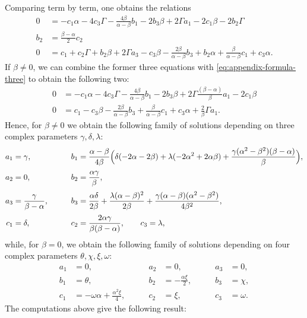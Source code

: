 \documentclass[10pt]{article}
\theoremstyle{definition}
\begin{document}
\endgroup
Comparing term by term, one obtains the relations
\begin{align*}
0 &= - c_1\alpha- 4c_3 \Gamma - \frac{4 \beta}{\alpha - \beta}b_1 - 2 b_3\beta+ 2 \Gamma a_1 - 2c_1 \beta- 2b_2 \Gamma \\
b_2 &=  \frac{\beta - \alpha}{2}c_2 \\
0 &= c_1+ c_2 \Gamma+ b_2 \beta +2 \Gamma a_3 - c_3 \beta- \frac{2 \beta}{\alpha - \beta}b_3 +  b_2 \alpha+ \frac{\beta}{\alpha - \beta}c_1+ c_3 \alpha.
\end{align*}
If $\beta\neq0$, we can combine the former three equations with \eqref{eq:appendix-formula-three} to obtain the following two:
\begin{align*}
0 &= - c_1\alpha- 4c_3 \Gamma - \frac{4\beta}{\alpha - \beta}b_1  - 2 b_3\beta+ 2 \Gamma\frac{(\beta-\alpha)}{\beta} a_1 - 2c_1 \beta \\
0 &= c_1 - c_3 \beta- \frac{2 \beta}{\alpha - \beta}b_3 +   \frac{\beta}{\alpha - \beta}c_1+ c_3 \alpha+\frac{2}{\beta}\Gamma a_{1}.
\end{align*}
Hence, for $\beta \neq 0$ we obtain the following family of solutions depending on three complex parameters $\gamma,\delta,\lambda$:
\[
\begin{aligned}
a_1 &= \gamma, \qquad &
b_1 &= \frac{\alpha-\beta}{4\beta}\Bigl(\delta(-2\alpha-2\beta)
+\lambda(-2\alpha^2+2\alpha\beta)
+\frac{\gamma(\alpha^2-\beta^2)(\beta-\alpha)}{\beta}\Bigr),\\[0.5ex]
a_2 &= 0, \qquad &
b_2 &= \frac{\alpha\gamma}{\beta},\\[0.5ex]
a_3 &= \frac{\gamma}{\beta-\alpha}, \qquad &
b_3 &= \frac{\alpha\delta}{2\beta}
+\frac{\lambda(\alpha-\beta)^2}{2\beta}
+\frac{\gamma(\alpha-\beta)(\alpha^2-\beta^2)}{4\beta^2},\\[0.5ex]
c_1 &= \delta, \qquad &
c_2 &= \frac{2\alpha\gamma}{\beta(\beta-\alpha)}, \qquad
c_3 = \lambda,
\end{aligned}
\]
while, for $\beta=0$, we obtain the following family of solutions depending on four complex parameters $\theta,\chi,\xi,\omega$:
\[
\begin{aligned}
a_1 &= 0, \qquad & a_2 &= 0, \qquad & a_3 &= 0,\\
b_1 &= \theta, \qquad & b_2 &= -\frac{\alpha\xi}{2}, \qquad & b_3 &= \chi,\\
c_1 &= -\omega\alpha+\frac{\alpha^2\xi}{4}, \qquad & c_2 &= \xi, \qquad & c_3 &= \omega.
\end{aligned}
\]
The computations above give the following result:
\end{document}
